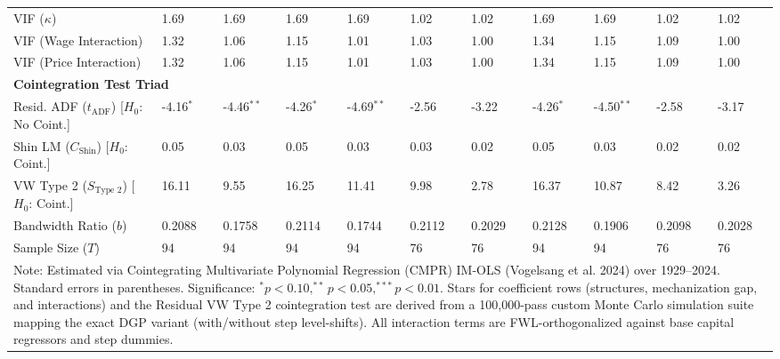 \begin{table}[H]
\begin{tabular}{p{3.5cm}p{1.0cm}p{1.0cm}p{1.0cm}p{1.0cm}p{1.0cm}p{1.0cm}p{1.0cm}p{1.0cm}p{1.0cm}p{1.0cm}}
VIF ($\kappa$) & 1.69 & 1.69 & 1.69 & 1.69 & 1.02 & 1.02 & 1.69 & 1.69 & 1.02 & 1.02 \\
VIF (Wage Interaction) & 1.32 & 1.06 & 1.15 & 1.01 & 1.03 & 1.00 & 1.34 & 1.15 & 1.09 & 1.00 \\
VIF (Price Interaction) & 1.32 & 1.06 & 1.15 & 1.01 & 1.03 & 1.00 & 1.34 & 1.15 & 1.09 & 1.00 \\
\midrule
\multicolumn{11}{l}{\textbf{Cointegration Test Triad}} \\
Resid. ADF ($t_{\text{ADF}}$) [$H_0$: No Coint.] & -4.16$^{*}$ & -4.46$^{**}$ & -4.26$^{*}$ & -4.69$^{**}$ & -2.56 & -3.22 & -4.26$^{*}$ & -4.50$^{**}$ & -2.58 & -3.17 \\
Shin LM ($C_{\text{Shin}}$) [$H_0$: Coint.] & 0.05 & 0.03 & 0.05 & 0.03 & 0.03 & 0.02 & 0.05 & 0.03 & 0.02 & 0.02 \\
VW Type 2 ($S_{\text{Type 2}}$) [$H_0$: Coint.] & 16.11 & 9.55 & 16.25 & 11.41 & 9.98 & 2.78 & 16.37 & 10.87 & 8.42 & 3.26 \\
\midrule
Bandwidth Ratio ($b$) & 0.2088 & 0.1758 & 0.2114 & 0.1744 & 0.2112 & 0.2029 & 0.2128 & 0.1906 & 0.2098 & 0.2028 \\
Sample Size ($T$) & 94 & 94 & 94 & 94 & 76 & 76 & 94 & 94 & 76 & 76 \\
\bottomrule
\multicolumn{11}{p{15cm}}{\footnotesize Note: Estimated via Cointegrating Multivariate Polynomial Regression (CMPR) IM-OLS (Vogelsang et al. 2024) over 1929--2024. Standard errors in parentheses. Significance: $^* p < 0.10, ^{**} p < 0.05, ^{***} p < 0.01$. Stars for coefficient rows (structures, mechanization gap, and interactions) and the Residual VW Type 2 cointegration test are derived from a 100,000-pass custom Monte Carlo simulation suite mapping the exact DGP variant (with/without step level-shifts). All interaction terms are FWL-orthogonalized against base capital regressors and step dummies.}
\end{tabular}
\end{table}
